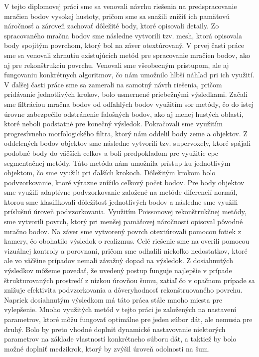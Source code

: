 V tejto diplomovej práci sme sa venovali návrhu riešenia na predspracovanie mračien bodov vysokej hustoty, pričom sme sa snažili znížiť ich pamäťovú náročnosť a zároveň zachovať dôležité body, ktoré opisovali detaily. Zo spracovaného mračna bodov sme následne vytvorili tzv. mesh, ktorá opisovala body spojitým povrchom, ktorý bol na záver otextúrovaný. 
\newline\indent V prvej časti práce sme sa venovali zhrnutiu existujúcich metód pre spracovanie mračien bodov, ako aj pre rekonštrukciu povrchu. Venovali sme všeobecným prístupom, ale aj fungovaniu konkrétnych algoritmov, čo nám umožnilo hlbší náhľad pri ich využití.
\newline\indent V ďalšej časti práce sme sa zamerali na samotný návrh riešenia, pričom pridávanie jednotlivých krokov, bolo usmernené priebežnými výsledkami. Začali sme filtráciou mračna bodov od odľahlých bodov využitím \acrshort{sor} metódy, čo do istej úrovne zabezpečilo odstránenie falošných bodov, ako aj menej hustých oblastí, ktoré neboli podstatné pre konečný výsledok. Pokračovali sme využitím progresívneho morfologického filtra, ktorý nám oddelil body zeme a objektov. Z oddelených bodov objektov sme následne vytvorili tzv. supervoxely, ktoré spájali podobné body do väčších celkov a boli predpokladom pre využitie \acrshort{cpc} segmentačnej metódy. Táto metóda nám umožnila prístup ku jednotlivým objektom, čo sme využili pri ďalších krokoch.
\newline\indent Dôležitým krokom bolo podvzorkovanie, ktoré výrazne znížilo celkový počet bodov. Pre body objektov sme využili adaptívne podvzorkovanie založené na metóde diferencií normál, ktorou sme klasifikovali dôležitosť jednotlivých bodov a následne sme využili príslušnú úroveň podvzorkovania. Využitím Poissonovej rekonštrukčnej metódy, sme vytvorili povrch, ktorý pri menšej pamäťovej náročnosti opisoval pôvodné mračno bodov. Na záver sme vytvorený povrch otextúrovali pomocou fotiek z kamery, čo obohatilo výsledok o realizmus.
\newline\indent Celé riešenie sme na overili pomocou vizuálnej kontroly a porovnaní, pričom sme odhalili niekoľko nedostatkov, ktoré ale vo väčšine prípadov nemali závažný dopad na výsledok. Z dosiahnutých výsledkov môžeme povedať, že uvedený postup funguje najlepšie v prípade štrukturovaných prostredí z nízkou úrovňou šumu, zatiaľ čo v opačnom prípade sa znižuje efektivita podvzorkovania a dôveryhodnosť rekonštruovaného povrchu.
\newline\indent Napriek dosiahnutým výsledkom má táto práca stále mnoho miesta pre vylepšenie. Mnoho využitých metód v tejto práci je založených na nastavení parametrov, ktoré môžu  fungovať optimálne pre jeden súbor dát, ale nemusia pre druhý. Bolo by preto vhodné doplniť dynamické nastavovanie niektorých parametrov na základe vlastností konkrétneho súboru dát, a taktiež by bolo možné doplniť medzikrok, ktorý by zvýšil úroveň odolnosti na šum.
